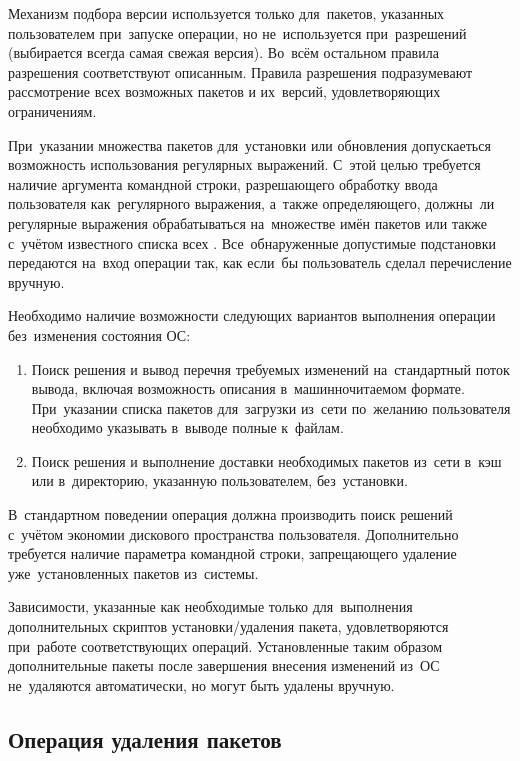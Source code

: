 Механизм подбора версии используется только для~пакетов, указанных пользователем при~запуске операции,
но не~используется при~разрешений  (выбирается всегда самая свежая версия).
Во~всём остальном правила разрешения  соответствуют описанным.
Правила разрешения  подразумевают рассмотрение всех возможных пакетов и их~версий, удовлетворяющих ограничениям.

При~указании множества пакетов для~установки или обновления  допускаеться возможность использования регулярных выражений.
С~этой целью требуется наличие аргумента командной строки,  разрешающего обработку ввода пользователя как~регулярного выражения,
а~также определяющего,  должны~ли регулярные выражения обрабатываться на~множестве имён пакетов или также с~учётом известного списка всех .
Все~обнаруженные допустимые подстановки передаются на~вход операции так, как если~бы пользователь сделал перечисление вручную.

Необходимо наличие возможности следующих вариантов выполнения операции без~изменения состояния ОС:

\begin{enumerate}

\item {
Поиск решения и вывод перечня требуемых изменений на~стандартный поток вывода,
включая возможность описания в~машинночитаемом формате.
При~указании списка пакетов для~загрузки из~сети по~желанию пользователя необходимо указывать в~выводе полные  к~файлам.
}

\item {
Поиск решения и выполнение доставки необходимых пакетов из~сети в~кэш или в~директорию, указанную пользователем, без~установки.
}

\end{enumerate}

В~стандартном поведении операция должна производить поиск решений с~учётом экономии дискового пространства пользователя. 
Дополнительно требуется наличие параметра командной строки, запрещающего удаление уже~установленных пакетов из~системы. 

Зависимости, указанные как необходимые только для~выполнения дополнительных скриптов установки/удаления пакета,
удовлетворяются при~работе соответствующих операций.
Установленные таким образом дополнительные пакеты после завершения внесения изменений из~ОС не~удаляются автоматически,
но могут быть удалены вручную.

\subsection{Операция удаления пакетов}

